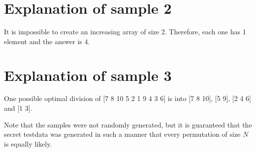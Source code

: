\section*{Explanation of sample 2}
It is impossible to create an increasing array of size 2. Therefore, each one has 1 element and the answer is
4.

\section*{Explanation of sample 3}
One possible optimal division of [7 8 10 5 2 1 9 4 3 6] is into [7 8 10], [5 9], [2 4 6] and [1 3].

Note that the samples were not randomly generated, but it is guaranteed that the secret testdata was generated
in such a manner that every permutation of size $N$ is equally likely.
